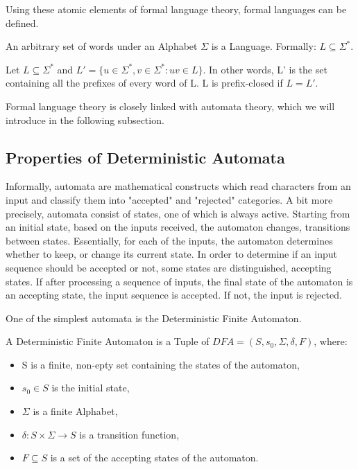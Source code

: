 Using these atomic elements of formal language theory, formal languages can be defined.

\begin{definition}
	An arbitrary set of words under an Alphabet $\Sigma$ is a Language. Formally: $L\subseteq\Sigma^{*}$.
\end{definition}

\begin{definition}
	Let $L\subseteq\Sigma^*$ and $L' = \{u\in\Sigma^*, v\in\Sigma^* : uv\in L\}$. In other words, L' is the set containing all the prefixes of every word of L. L is prefix-closed if $L = L'$.
\end{definition}

Formal language theory is closely linked with automata theory, which we will introduce in the following subsection.

\subsection{Properties of Deterministic Automata}

Informally, automata are mathematical constructs which read characters from an input and classify them into "accepted" and "rejected" categories. A bit more precisely, automata consist of states, one of which is always active. Starting from an initial state, based on the inputs received, the automaton changes, transitions between states. Essentially, for each of the inputs, the automaton determines whether to keep, or change its current state. In order to determine if an input sequence should be accepted or not, some states are distinguished, accepting states. If after processing a sequence of inputs, the final state of the automaton is an accepting state, the input sequence is accepted. If not, the input is rejected.


One of the simplest automata is the Deterministic Finite Automaton.

\begin{definition}
	A Deterministic Finite Automaton is a Tuple of $ DFA=(S,s_{0},\Sigma,\delta,F) $, where: 
	\begin{itemize}
		\item S is a finite, non-epty set containing the states of the automaton,
		\item $s_{0} \in S$ is the initial state,
		\item $\Sigma$ is a finite Alphabet,
		\item $\delta: S\times \Sigma \to S$ is a transition function,
		\item $F\subseteq S$ is a set of the accepting states of the automaton. 
	\end{itemize}
\end{definition}

